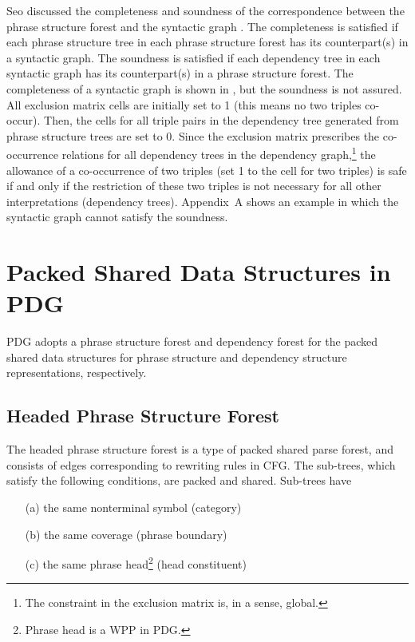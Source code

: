 \documentclass[english]{jnlp_1.4_rep}
\theoremstyle{break}
\theoremstyle{plain}
\theoremstyle{plain}
\begin{document}
Seo discussed the completeness and soundness of the correspondence
between the phrase structure forest and the syntactic
graph \cite{Seo89}. The completeness is satisfied if each phrase
structure tree in each phrase structure forest has its counterpart(s)
in a syntactic graph. The soundness is satisfied if each dependency
tree in each syntactic graph has its counterpart(s) in a phrase
structure forest. The completeness of a syntactic graph is shown in
\cite{Seo89}, but the soundness is not assured. All exclusion matrix
cells are initially set to 1 (this means no two triples
co-occur). Then, the cells for all triple pairs in the dependency
tree generated from phrase structure trees are set to 0. Since the
exclusion matrix prescribes the co-occurrence relations for all
dependency trees in the dependency graph,\footnote{The constraint in
  the exclusion matrix is, in a sense, global.} the allowance of a
co-occurrence of two triples (set 1 to the cell for two triples) is
safe if and only if the restriction of these two triples is not
necessary for all other interpretations (dependency trees). Appendix~A
shows an example in which the syntactic graph cannot satisfy the
soundness.


\section{Packed Shared Data Structures in PDG}
\label{sec:datastructure}

PDG adopts a phrase structure forest and dependency forest for
the packed shared data structures for phrase structure and dependency
structure representations, respectively.


\subsection{Headed Phrase Structure Forest}

The headed phrase structure forest is a type of packed shared parse forest,
and consists of edges corresponding to rewriting rules in CFG. The
sub-trees, which satisfy the following conditions, are packed and
shared. Sub-trees have
\begin{itemize}
\item[(a)] the same nonterminal symbol (category) 
\item[(b)] the same coverage (phrase boundary)
\item[(c)] the same phrase head\footnote{Phrase head is a WPP in PDG.} (head constituent)
\end{itemize}
\end{document}
